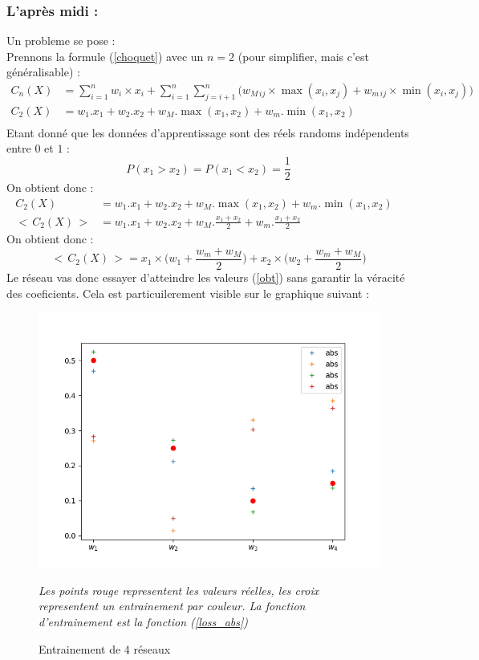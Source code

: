 \subsubsection*{L'après midi :}
Un probleme se pose :\\
Prennons la formule (\ref{choquet}) avec un $n = 2$ (pour simplifier, mais c'est généralisable) :
\begin{align*}
    C_n (X)
    & =
        \sum_{i=1}^{n}
                w_i \times x_i +
            \sum_{i=1}^{n}\sum_{j=i+1}^{n}
            \Big(
                w_{M\,ij} \times \max(x_i,x_j) + w_{m\,ij} \times \min(x_i,x_j)
            \Big)
    &\\
    C_2 (X)
    & =
        w_1.x_1 + w_2.x_2 + w_M.\max(x_1,x_2) + w_m.\min(x_1,x_2)
    &\\
\end{align*}
Etant donné que les données d'apprentissage sont des réels randoms indépendents entre $0$ et $1$ :
\begin{equation}
    \label{proba}
    P(x_1 > x_2) = P(x_1 < x_2) = \frac{1}{2}
\end{equation}
On obtient donc :
\begin{align*}
    C_2 (X)
    & =
        w_1.x_1 + w_2.x_2 + w_M.\max(x_1,x_2) + w_m.\min(x_1,x_2)
    &\\
    <\, C_2 (X) \,>
    & =
        w_1.x_1 + w_2.x_2 + w_M.\frac{x_1 + x_2}{2} + w_m.\frac{x_1 + x_2}{2}
    &
\end{align*}
On obtient donc :
\begin{equation}
    \label{obt}
    <\, C_2 (X) \,> =
        x_1 \times \Big(w_1 + \frac{w_m + w_M}{2}\Big) + x_2 \times \Big(w_2 + \frac{w_m + w_M}{2}\Big)
\end{equation}
Le réseau vas donc essayer d'atteindre les valeurs (\ref{obt}) sans garantir la véracité des coeficients.
Cela est particuilerement visible sur le graphique suivant :
\begin{figure}[H]
    \centering
    \includegraphics[height=\grand]{sources/data/graphs/pb_adherence.png}
    \label{pb_adherence}
    \caption{Entrainement de 4 réseaux}
    \textit{
        Les points rouge representent les valeurs réelles, les croix representent un entrainement par couleur.
        La fonction d'entrainement est la fonction (\ref{loss_abs})
    }
\end{figure}
